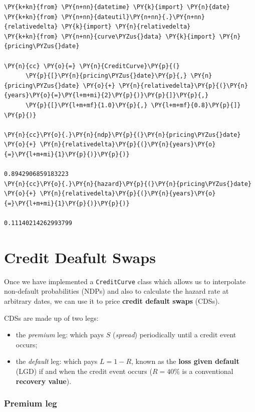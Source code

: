 \begin{tcolorbox}[breakable, size=fbox, boxrule=1pt, pad at break*=1mm,colback=cellbackground, colframe=cellborder]
\begin{Verbatim}[commandchars=\\\{\}]
\PY{k+kn}{from} \PY{n+nn}{datetime} \PY{k}{import} \PY{n}{date}
\PY{k+kn}{from} \PY{n+nn}{dateutil}\PY{n+nn}{.}\PY{n+nn}{relativedelta} \PY{k}{import} \PY{n}{relativedelta}
\PY{k+kn}{from} \PY{n+nn}{curve\PYZus{}data} \PY{k}{import} \PY{n}{pricing\PYZus{}date}
        
\PY{n}{cc} \PY{o}{=} \PY{n}{CreditCurve}\PY{p}{(}
      \PY{p}{[}\PY{n}{pricing\PYZus{}date}\PY{p}{,} \PY{n}{pricing\PYZus{}date} \PY{o}{+} \PY{n}{relativedelta}\PY{p}{(}\PY{n}{years}\PY{o}{=}\PY{l+m+mi}{2}\PY{p}{)}\PY{p}{]}\PY{p}{,}
      \PY{p}{[}\PY{l+m+mf}{1.0}\PY{p}{,} \PY{l+m+mf}{0.8}\PY{p}{]}
\PY{p}{)}

\PY{n}{cc}\PY{o}{.}\PY{n}{ndp}\PY{p}{(}\PY{n}{pricing\PYZus{}date} \PY{o}{+} \PY{n}{relativedelta}\PY{p}{(}\PY{n}{years}\PY{o}{=}\PY{l+m+mi}{1}\PY{p}{)}\PY{p}{)}

0.8942906859183223
\PY{n}{cc}\PY{o}{.}\PY{n}{hazard}\PY{p}{(}\PY{n}{pricing\PYZus{}date} \PY{o}{+} \PY{n}{relativedelta}\PY{p}{(}\PY{n}{years}\PY{o}{=}\PY{l+m+mi}{1}\PY{p}{)}\PY{p}{)}

0.11140214262993799
\end{Verbatim}
\end{tcolorbox}    
            
\section{Credit Deafult Swaps}\label{credit-deafult-swaps}

Once we have implemented a \texttt{CreditCurve} class which allows us to
interpolate non-default probabilities (NDPs) and also to calculate the hazard rate at arbitrary
dates, we can use it to price \textbf{credit default swaps} (CDSs).

CDSs are made up of two legs:

\begin{itemize}
\tightlist
\item
  the \emph{premium} leg: which pays \(S\) (\emph{spread}) periodically until a credit event occurs;
\item
  the \emph{default} leg: which pays \(L = 1 - R\), known as the
  \textbf{loss given default} (LGD) if and when the credit event occurs 
  (\(R = 40\%\) is a conventional \textbf{recovery value}).
\end{itemize}

\subsubsection{Premium leg}\label{premium-leg}


